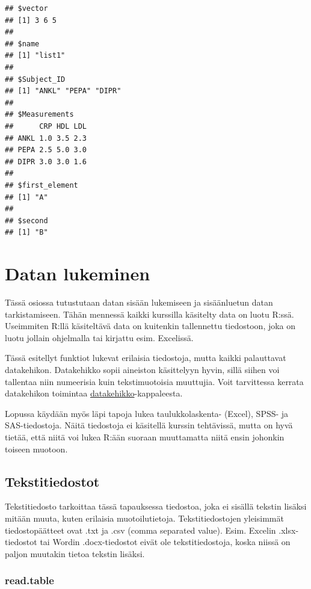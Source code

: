 \documentclass[
]{book}
\begin{document}
\begin{verbatim}
## $vector
## [1] 3 6 5
## 
## $name
## [1] "list1"
## 
## $Subject_ID
## [1] "ANKL" "PEPA" "DIPR"
## 
## $Measurements
##      CRP HDL LDL
## ANKL 1.0 3.5 2.3
## PEPA 2.5 5.0 3.0
## DIPR 3.0 3.0 1.6
## 
## $first_element
## [1] "A"
## 
## $second
## [1] "B"
\end{verbatim}

\hypertarget{reading_data}{%
\chapter{Datan lukeminen}\label{reading_data}}

Tässä osiossa tutustutaan datan sisään lukemiseen ja sisäänluetun datan tarkistamiseen. Tähän mennessä kaikki kurssilla käsitelty data on luotu R:ssä. Useimmiten R:llä käsiteltävä data on kuitenkin tallennettu tiedostoon, joka on luotu jollain ohjelmalla tai kirjattu esim. Excelissä.

Tässä esitellyt funktiot lukevat erilaisia tiedostoja, mutta kaikki palauttavat datakehikon. Datakehikko sopii aineiston käsittelyyn hyvin, sillä siihen voi tallentaa niin numeerisia kuin tekstimuotoisia muuttujia. Voit tarvittessa kerrata datakehikon toimintaa \protect\hyperlink{data-frame}{datakehikko}-kappaleesta.

Lopussa käydään myös läpi tapoja lukea taulukkolaskenta- (Excel), SPSS- ja SAS-tiedostoja. Näitä tiedostoja ei käsitellä kurssin tehtävissä, mutta on hyvä tietää, että niitä voi lukea R:ään suoraan muuttamatta niitä ensin johonkin toiseen muotoon.

\hypertarget{tekstitiedostot}{%
\section{Tekstitiedostot}\label{tekstitiedostot}}

Tekstitiedosto tarkoittaa tässä tapauksessa tiedostoa, joka ei sisällä tekstin lisäksi mitään muuta, kuten erilaisia muotoilutietoja. Tekstitiedostojen yleisimmät tiedostopäätteet ovat .txt ja .csv (comma separated value). Esim. Excelin .xlsx-tiedostot tai Wordin .docx-tiedostot eivät ole tekstitiedostoja, koska niissä on paljon muutakin tietoa tekstin lisäksi.

\hypertarget{read.table}{%
\subsection{read.table}\label{read.table}}
\end{document}
